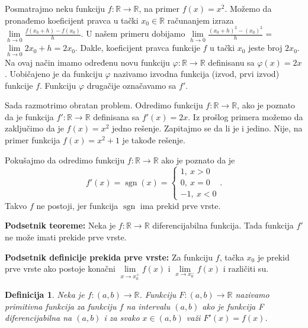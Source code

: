 \documentclass{article}
\newtheorem{definicija}{Definicija}[section]
\DeclareMathOperator{\sgn}{sgn}
\begin{document}
Posmatrajmo neku funkciju $f:\mathbb{R}\longrightarrow\mathbb{R}$, na primer
$f\left(x\right)=x^2$. Možemo da pronađemo koeficijent pravca u tački $x_0\in\mathbb{R}$
računanjem izraza $\lim\limits_{h\to0}\frac{f\left(x_0+h\right)-f\left(x_0\right)}{h}$.
U našem primeru dobijamo
$\lim\limits_{h\to0}\frac{\left(x_0+h\right)^2-\left(x_0\right)^2}{h}=$
$\lim\limits_{h\to0}2x_0+h=2x_0$. Dakle, koeficijent pravca funkcije $f$ u tački
$x_0$ jeste broj $2 x_0$. Na ovaj način imamo određenu novu funkciju
$\varphi:\mathbb{R}\longrightarrow\mathbb{R}$ definisanu sa $\varphi\left(x\right)=2x$.
Uobičajeno je da funkciju $\varphi$ nazivamo izvodna funkcija (izvod, prvi izvod)
funkcije $f$. Funkciju $\varphi$ drugačije označavamo sa $f'$.\par
Sada razmotrimo obratan problem. Odredimo funkciju $f:\mathbb{R}\longrightarrow\mathbb{R}$,
ako je poznato da je funkcija $f':\mathbb{R}\longrightarrow\mathbb{R}$ definisana
sa $f'\left(x\right)=2x$. Iz prošlog primera možemo da zaključimo da je $f\left(x\right)=x^2$
jedno rešenje. Zapitajmo se da li je i jedino. Nije, na primer funkcija $f\left(x\right)=x^2+1$
je takođe rešenje.\par
Pokušajmo da odredimo funkciju $f:\mathbb{R}\longrightarrow\mathbb{R}$ ako je poznato da je
$$
    f'\left(x\right)=\sgn\left(x\right)=
    \begin{cases}
        1,\ x>0 \\
        0,\ x=0 \\
        -1,\ x<0
    \end{cases}.
$$
Takvo $f$ ne postoji, jer funkcija $\sgn$ ima prekid prve vrste.

\begin{teoremabox}
    \label{podsetnik_teoreme_1}
    \textbf{Podsetnik teoreme:} Neka je $f:\mathbb{R}\longrightarrow\mathbb{R}$
    diferencijabilna funkcija. Tada funkcija $f'$ ne može imati prekide prve vrste.
\end{teoremabox}

\begin{defbox}
    \label{podsetnik_definicije_1}
    \textbf{Podsetnik definicije prekida prve vrste:} Za funkciju $f$, tačka $x_0$
    je prekid prve vrste ako postoje konačni $\lim\limits_{x\rightarrow x_0^+}f\left(x\right)$
    i $\lim\limits_{x\rightarrow x_0^-}f\left(x\right)$ i različiti su.
\end{defbox}

\begin{defbox}
    \label{definicija_1.1}
    \begin{definicija}
        Neka je $f:\left(a, b\right) \longrightarrow \mathbb{R}$.
        Funkciju $F:\left(a, b\right) \longrightarrow \mathbb{R}$ nazivamo primitivna
        funkcija za funkciju $f$ na intervalu $\left(a, b\right)$ ako je funkcija F
        diferencijabilna na $\left(a, b\right)$ i za svako $x \in \left(a,b\right)$ važi
        $F'\left(x\right) = f\left(x\right)$.
    \end{definicija}
\end{defbox}
\end{document}
